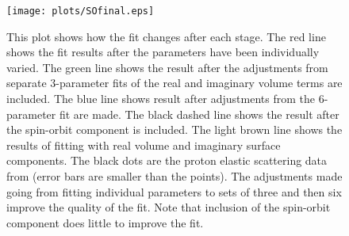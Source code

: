 \documentclass[]{scrartcl}
\begin{document}
\begin{figure}
\centering
	\texttt{[image: plots/SOfinal.eps]}
	\caption{This plot shows how the fit changes after each stage. The red line shows the fit results after the parameters have been individually varied. The green line shows the result after the adjustments from separate 3-parameter fits of the real and imaginary volume terms are included. The blue line shows result after adjustments from the 6-parameter fit are made. The black dashed line shows the result after the spin-orbit component is included. The light brown line shows the results of fitting with real volume and imaginary surface components. The black dots are the proton elastic scattering data from \citep{Sinha1972} (error bars are smaller than the points). The adjustments made going from fitting individual parameters to sets of three and then six improve the quality of the fit. Note that inclusion of the spin-orbit component does little to improve the fit.}
	\label{fig:fits}
\end{figure}





\end{document}
